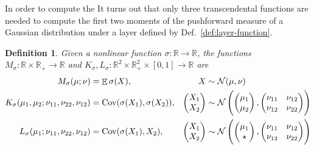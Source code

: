 \documentclass{article}
\newtheorem{definition}{Definition}
\DeclareMathOperator{\expect}{\mathbb{E}}
\DeclareMathOperator{\Cov}{\operatorname{Cov}}
\begin{document}
In order to compute the 
It turns out that only three transcendental functions are needed to compute the first two moments of the pushforward measure of a Gaussian distribution under a layer defined by Def.~\ref{def:layer-function}.
\begin{definition}
  \label{def:moment-maps}
  Given a nonlinear function \(\sigma: \mathbb{R} \to \mathbb R\),
  the functions \(M_\sigma: \mathbb{R}  \times \mathbb{R}_+ \to
  \mathbb{R}\) and \(K_\sigma, L_\sigma: \mathbb{R}^2 \times \mathbb
  R_+^2 \times [0, 1] \to \mathbb{R}\) are
  \begin{align*}
    M_\sigma(\mu; \nu) &= \expect{\sigma(X)},
    & X &\sim \mathcal N(\mu, \nu)
    \\
    K_\sigma(\mu_1, \mu_2; \nu_{11}, \nu_{22}, \nu_{12}) &= \Cov
    (\sigma(X_1), \sigma(X_2)),
    &
    \begin{pmatrix}
      X_1 \\ X_2
    \end{pmatrix} &\sim \mathcal N\del{
      \begin{pmatrix}
        \mu_1 \\ \mu_2
      \end{pmatrix},
      \begin{pmatrix}
        \nu_{11} & \nu_{12} \\
        \nu_{12} & \nu_{22}
      \end{pmatrix}
    }
    \\
    L_\sigma(\mu_1; \nu_{11}, \nu_{22}, \nu_{12}) &= \Cov
    (\sigma(X_1), X_2),
    &
    \begin{pmatrix}
      X_1 \\ X_2
    \end{pmatrix} &\sim \mathcal N\del{
      \begin{pmatrix}
        \mu_1 \\ \star
      \end{pmatrix},
      \begin{pmatrix}
        \nu_{11} & \nu_{12} \\
        \nu_{12} & \nu_{22}
      \end{pmatrix}
    }
    \\
  \end{align*}
\end{definition}
\end{document}
